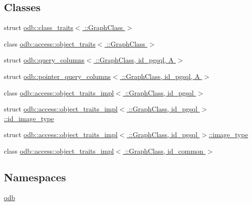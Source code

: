 \subsection*{Classes}
\begin{DoxyCompactItemize}
\item 
struct \hyperlink{structodb_1_1class__traits_3_01_1_1_graph_class_01_4}{odb\+::class\+\_\+traits$<$ \+::\+Graph\+Class $>$}
\item 
class \hyperlink{classodb_1_1access_1_1object__traits_3_01_1_1_graph_class_01_4}{odb\+::access\+::object\+\_\+traits$<$ \+::\+Graph\+Class $>$}
\item 
struct \hyperlink{structodb_1_1query__columns_3_01_1_1_graph_class_00_01id__pgsql_00_01_a_01_4}{odb\+::query\+\_\+columns$<$ \+::\+Graph\+Class, id\+\_\+pgsql, A $>$}
\item 
struct \hyperlink{structodb_1_1pointer__query__columns_3_01_1_1_graph_class_00_01id__pgsql_00_01_a_01_4}{odb\+::pointer\+\_\+query\+\_\+columns$<$ \+::\+Graph\+Class, id\+\_\+pgsql, A $>$}
\item 
class \hyperlink{classodb_1_1access_1_1object__traits__impl_3_01_1_1_graph_class_00_01id__pgsql_01_4}{odb\+::access\+::object\+\_\+traits\+\_\+impl$<$ \+::\+Graph\+Class, id\+\_\+pgsql $>$}
\item 
struct \hyperlink{structodb_1_1access_1_1object__traits__impl_3_01_1_1_graph_class_00_01id__pgsql_01_4_1_1id__image__type}{odb\+::access\+::object\+\_\+traits\+\_\+impl$<$ \+::\+Graph\+Class, id\+\_\+pgsql $>$\+::id\+\_\+image\+\_\+type}
\item 
struct \hyperlink{structodb_1_1access_1_1object__traits__impl_3_01_1_1_graph_class_00_01id__pgsql_01_4_1_1image__type}{odb\+::access\+::object\+\_\+traits\+\_\+impl$<$ \+::\+Graph\+Class, id\+\_\+pgsql $>$\+::image\+\_\+type}
\item 
class \hyperlink{classodb_1_1access_1_1object__traits__impl_3_01_1_1_graph_class_00_01id__common_01_4}{odb\+::access\+::object\+\_\+traits\+\_\+impl$<$ \+::\+Graph\+Class, id\+\_\+common $>$}
\end{DoxyCompactItemize}
\subsection*{Namespaces}
\begin{DoxyCompactItemize}
\item 
 \hyperlink{namespaceodb}{odb}
\end{DoxyCompactItemize}
